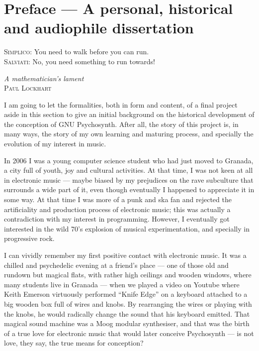 
\chapter*{Preface --- A personal, historical and audiophile
  dissertation}

\epigraph{
\textsc{Simplico:} You need to walk before you can run.\\
\textsc{Salviati:} No, you need something to run towards!
}{\emph{A mathematician's lament}\\
\textsc{Paul Lockhart}}

I am going to let the formalities, both in form and content, of a
final project aside in this section to give an initial background on
the historical development of the conception of GNU Psychosynth. After
all, the story of this project is, in many ways, the story of my own
learning and maturing process, and specially the evolution of my
interest in music.

In 2006 I was a young computer science student who had just moved to
Granada, a city full of youth, joy and cultural activities. At that
time, I was not keen at all in electronic music --- maybe biased by my
prejudices on the rave subculture that surrounds a wide part of it,
even though eventually I happened to appreciate it in some way. At
that time I was more of a punk and ska fan and rejected the
artificiality and production process of electronic music; this was
actually a contradiction with my interest in programming. However, I
eventually got interested in the wild 70's explosion of
musical experimentation, and specially in progressive rock.

I can vividly remember my first positive contact with electronic
music. It was a chilled and psychedelic evening at a friend's place
--- one of those old and rundown but magical flats, with rather high
ceilings and wooden windows, where many students live in Granada ---
when we played a video on Youtube where Keith Emerson virtuously
performed ``Knife Edge'' on a keyboard attached to a big wooden box
full of wires and knobs. By rearranging the wires or playing with the
knobs, he would radically change the sound that his keyboard
emitted. That magical sound machine was a Moog modular
synthesiser, and that was the birth of a true love for electronic
music that would later conceive Psychosynth --- is not love, they say,
the true means for conception?

